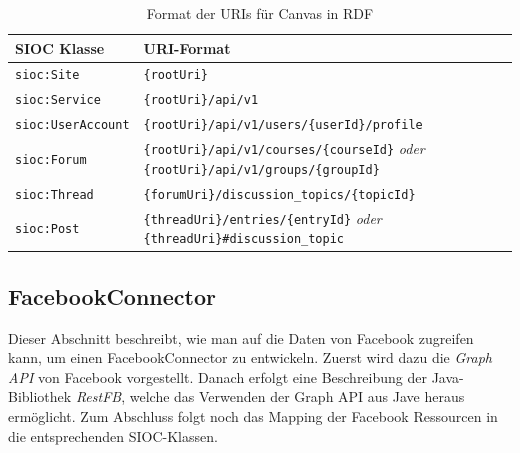\begin{table}[ht]
    \centering
    \caption{Format der URIs für Canvas in RDF}
    \begin{tabular}{l|p{13cm}}
        \textbf{SIOC Klasse} & \textbf{URI-Format}\\ 
        \hline
        \texttt{sioc:Site} & 
        \texttt{\{rootUri\}} \\

        \texttt{sioc:Service} & 
        \texttt{\{rootUri\}/api/v1} \\

        \texttt{sioc:UserAccount} & 
        \texttt{\{rootUri\}/api/v1/users/\{userId\}/profile} \\

        \texttt{sioc:Forum} & 
        \texttt{\{rootUri\}/api/v1/courses/\{courseId\}} \emph{oder} \newline  \texttt{\{rootUri\}/api/v1/groups/\{groupId\}} \\

        \texttt{sioc:Thread} & 
        \texttt{\{forumUri\}/discussion\_topics/\{topicId\}} \\

        \texttt{sioc:Post} & 
        \texttt{\{threadUri\}/entries/\{entryId\}} \emph{oder} \newline \texttt{\{threadUri\}\#discussion\_topic} \\
    \end{tabular}
    \label{tbl:canvas_uri_platzhalter}
\end{table}



\subsection{FacebookConnector} %
\label{sub:facebook_connector}

Dieser Abschnitt beschreibt, wie man auf die Daten von Facebook zugreifen kann, um einen FacebookConnector zu entwickeln. Zuerst wird dazu die \emph{Graph API} von Facebook vorgestellt. Danach erfolgt eine Beschreibung der Java-Bibliothek \emph{RestFB}, welche das Verwenden der Graph API aus Jave heraus ermöglicht. Zum Abschluss folgt noch das Mapping der Facebook Ressourcen in die entsprechenden SIOC-Klassen. 

